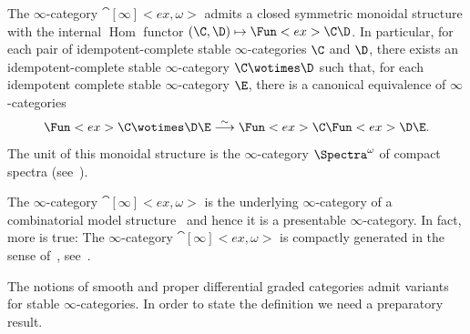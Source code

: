 \documentclass[a4paper]{amsart}
\begin{document}
\begin{theorem}
  The $\infty$-category $\cat[\infty]<ex,\omega>$ admits a closed symmetric
  monoidal structure with the internal $\operatorname{Hom}$ functor
  $(\C,\D)\mapsto\Fun<ex>{\C}{\D}$. In particular, for each pair of
  idempotent-complete stable $\infty$-categories $\C$ and $\D$, there exists an
  idempotent-complete stable $\infty$-category $\C\wotimes\D$ such that, for
  each idempotent complete stable $\infty$-category $\E$, there is a canonical
  equivalence of $\infty$-categories
  \[
    \Fun<ex>{\C\wotimes\D}{\E}\stackrel{\sim}{\longrightarrow}\Fun<ex>{\C}{\Fun<ex>{\D}{\E}}.
  \]
  The unit of this monoidal structure is the $\infty$-category $\Spectra^\omega$
  of compact spectra (see~).
\end{theorem}

\begin{remark}
  The $\infty$-category $\cat[\infty]<ex,\omega>$ is the underlying
  $\infty$-category of a combinatorial model
  structure~\cite[Theorem~4.23]{BGT13} and hence it is a presentable
  $\infty$-category. In fact, more is true: The $\infty$-category
  $\cat[\infty]<ex,\omega>$ is compactly generated in the sense
  of~\cite[Definition~5.5.7.1]{Lur09}, see~\cite[Corollary~4.25]{BGT13}.
\end{remark}

The notions of smooth and proper differential graded categories admit variants for
stable $\infty$-categories. In order to state the definition we need a
preparatory result.
\end{document}
